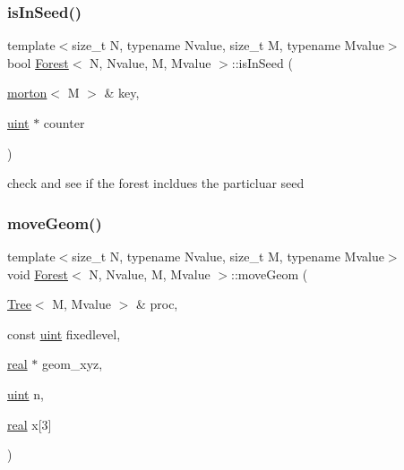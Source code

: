 \mbox{\label{classForest_a7c5750aeea54c572658a475dd1e67123}} 
\subsubsection{\texorpdfstring{is\+In\+Seed()}{isInSeed()}}
{\footnotesize\ttfamily template$<$size\+\_\+t N, typename Nvalue, size\+\_\+t M, typename Mvalue$>$ \\
bool \mbox{\hyperlink{classForest}{Forest}}$<$ N, Nvalue, M, Mvalue $>$\+::is\+In\+Seed (\begin{DoxyParamCaption}\item[{\mbox{\hyperlink{definitions_8h_af8682350bd8bb38ee9023f7a0a310add}{morton}}$<$ M $>$ \&}]{key,  }\item[{\mbox{\hyperlink{definitions_8h_a69aa29b598b851b0640aa225a9e5d61d}{uint}} $\ast$}]{counter }\end{DoxyParamCaption})}

check and see if the forest incldues the particluar seed \mbox{\label{classForest_a74688a7a09b343125d95df9d46960632}} 
\subsubsection{\texorpdfstring{move\+Geom()}{moveGeom()}}
{\footnotesize\ttfamily template$<$size\+\_\+t N, typename Nvalue, size\+\_\+t M, typename Mvalue$>$ \\
void \mbox{\hyperlink{classForest}{Forest}}$<$ N, Nvalue, M, Mvalue $>$\+::move\+Geom (\begin{DoxyParamCaption}\item[{\mbox{\hyperlink{classTree}{Tree}}$<$ M, Mvalue $>$ \&}]{proc,  }\item[{const \mbox{\hyperlink{definitions_8h_a69aa29b598b851b0640aa225a9e5d61d}{uint}}}]{fixedlevel,  }\item[{\mbox{\hyperlink{definitions_8h_aedc0ad84d1e764530814f57ad931d02a}{real}} $\ast$}]{geom\+\_\+xyz,  }\item[{\mbox{\hyperlink{definitions_8h_a69aa29b598b851b0640aa225a9e5d61d}{uint}}}]{n,  }\item[{\mbox{\hyperlink{definitions_8h_aedc0ad84d1e764530814f57ad931d02a}{real}}}]{x\mbox{[}3\mbox{]} }\end{DoxyParamCaption})}


